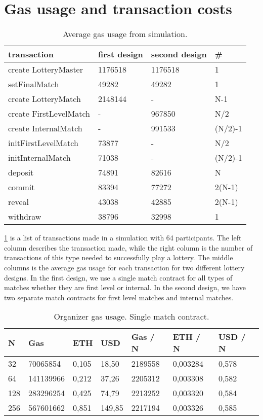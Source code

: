\section{Gas usage and transaction costs}
\label{sec:gas}

\begin{table}[h]
\centering
\caption{Average gas usage from simulation.}
\label{tab:gas-usage}
\begin{tabular}{|l|l|l|l|}
\hline

transaction & first design & second design & \# \\ \hline
create LotteryMaster & 1176518 & 1176518 & 1 \\ \hline
setFinalMatch & 49282 & 49282 & 1 \\ \hline
create LotteryMatch & 2148144 & - & N-1 \\ \hline
create FirstLevelMatch & - & 967850 & N/2 \\ \hline
create InternalMatch & - & 991533 & (N/2)-1 \\ \hline
initFirstLevelMatch & 73877 & - & N/2 \\ \hline
initInternalMatch & 71038 & - & (N/2)-1 \\ \hline
deposit & 74891 & 82616 & N \\ \hline
commit & 83394 & 77272 & 2(N-1) \\ \hline
reveal & 43038 & 42885 & 2(N-1) \\ \hline
withdraw & 38796 & 32998 & 1 \\ \hline

\end{tabular}
\end{table}

\noindent
\ref{tab:gas-usage} is a list of transactions made in a simulation with 64 participants. The left column describes the transaction made, while the right column is the number of transactions of this type needed to successfully play a lottery. The middle columns is the average gas usage for each transaction for two different lottery designs. In the first design, we use a single match contract for all types of matches whether they are first level or internal. In the second design, we have two separate match contracts for first level matches and internal matches. 

\begin{table}[h]
\centering
\caption{Organizer gas usage. Single match contract.}
\label{tab:org-gas-usage-single}
\begin{tabular}{|l|l|l|l|l|l|l|}
\hline

N & Gas & ETH & USD & Gas / N & ETH / N & USD / N \\ \hline
32 & 70065854 & 0,105 & 18,50 & 2189558 & 0,003284 & 0,578 \\ \hline
64 & 141139966 & 0,212 & 37,26 & 2205312 & 0,003308 & 0,582 \\ \hline
128 & 283296254 & 0,425 & 74,79 & 2213252 & 0,003320 & 0,584 \\ \hline
256 & 567601662 & 0,851 & 149,85 & 2217194 & 0,003326 & 0,585 \\ \hline

\end{tabular}
\end{table}

